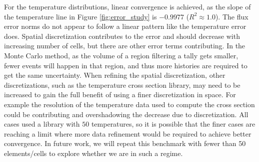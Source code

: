 \documentclass[letterpaper]{mc2023}
\begin{document}
For the temperature distributions, linear convergence is achieved, as the slope of the temperature line in Figure \ref{fig:error_study} is
$-0.9977$ ($R^2\approx1.0$). The flux error norms do not appear to follow a linear pattern like the temperature error does. Spatial discretization
contributes to the error and should decrease with increasing number of cells, but there are other error terms contributing. In the Monte Carlo
method, as the volume of a region filtering a tally gets smaller, fewer events will happen in that region, and thus more histories are required
to get the same uncertainty. When refining the spatial discretization, other discretizations, such as the temperature cross section library,
may need to be increased to gain the full benefit of using a finer discretization in space. For example the resolution of the temperature data
used to compute the cross section could be contributing and overshadowing the decrease due to discretization. All cases used a library with $50$
temperatures, so it is possible that the finer cases are reaching a limit where more data refinement would be required to achieve better
convergence. In future work, we will repeat this benchmark with fewer than 50 elements/cells to explore whether we are in such a regime.
\end{document}

